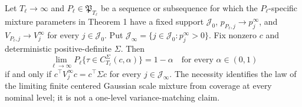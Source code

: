 Let \(T_\ell\to\infty\) and \(P_\ell\in\mathfrak P_{T_\ell}\) be a sequence or subsequence for which the \(P_\ell\)-specific mixture parameters in Theorem 1 have a fixed support \(\mathcal J_0\), \(p_{P_\ell,j}\to p_j^\infty\), and \(V_{P_\ell,j}\to V_j^\infty\) for every \(j\in\mathcal J_0\). Put \(\mathcal J_\infty=\{j\in\mathcal J_0:p_j^\infty>0\}\). Fix nonzero \(c\) and deterministic positive-definite \(\Sigma\). Then
\[
 \lim_{\ell\to\infty}P_\ell\{\tau\in C_{T_\ell}^{\Sigma}(c,\alpha)\}=1-\alpha
 \quad\text{for every }\alpha\in(0,1)
\]
if and only if \(c^\top V_j^\infty c=c^\top\Sigma c\) for every \(j\in\mathcal J_\infty\). The necessity identifies the law of the limiting finite centered Gaussian scale mixture from coverage at every nominal level; it is not a one-level variance-matching claim.